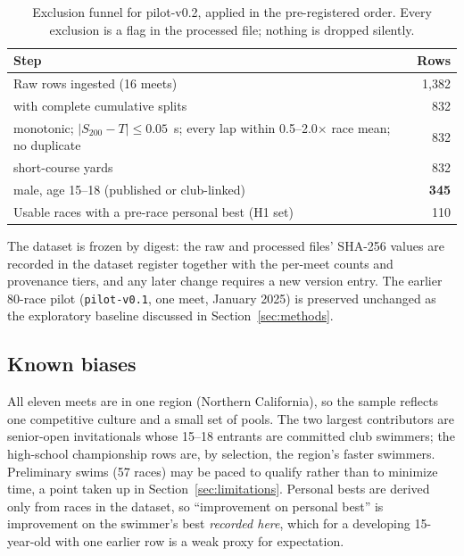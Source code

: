 \begin{table}[htbp]
\centering
\caption{Exclusion funnel for pilot-v0.2, applied in the pre-registered
order. Every exclusion is a flag in the processed file; nothing is dropped
silently.}
\label{tab:funnel}
\begin{tabular}{lr}
\toprule
Step & Rows \\
\midrule
Raw rows ingested (16 meets) & 1{,}382 \\
\quad with complete cumulative splits & 832 \\
\quad monotonic; $|S_{200}-T|\le0.05$~s; every lap within 0.5--2.0$\times$ race mean; no duplicate & 832 \\
\quad short-course yards & 832 \\
\quad male, age 15--18 (published or club-linked) & \textbf{345} \\
\midrule
Usable races with a pre-race personal best (H1 set) & 110 \\
\bottomrule
\end{tabular}
\end{table}

The dataset is frozen by digest: the raw and processed files' SHA-256 values
are recorded in the dataset register together with the per-meet counts and
provenance tiers, and any later change requires a new version entry. The
earlier 80-race pilot (\texttt{pilot-v0.1}, one meet, January 2025) is
preserved unchanged as the exploratory baseline discussed in
Section~\ref{sec:methods}.

\subsection{Known biases}

All eleven meets are in one region (Northern California), so the sample
reflects one competitive culture and a small set of pools. The two largest
contributors are senior-open invitationals whose 15--18 entrants are
committed club swimmers; the high-school championship rows are, by
selection, the region's faster swimmers. Preliminary swims (57 races) may be
paced to qualify rather than to minimize time, a point taken up in
Section~\ref{sec:limitations}. Personal bests are derived only from races in
the dataset, so ``improvement on personal best'' is improvement on the
swimmer's best \emph{recorded here}, which for a developing 15-year-old with
one earlier row is a weak proxy for expectation.

\FloatBarrier
